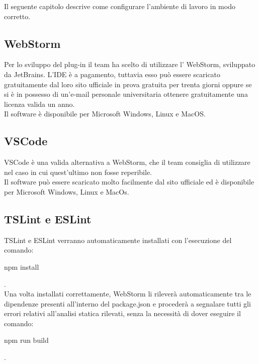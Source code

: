 Il seguente capitolo descrive come configurare l'ambiente di lavoro in modo corretto.

\subsection{WebStorm}
Per lo sviluppo del plug-in il team ha scelto di utilizzare l' WebStorm, sviluppato da JetBrains. L'IDE è a pagamento, tuttavia esso può essere scaricato gratuitamente dal loro sito ufficiale in prova gratuita per trenta giorni oppure se si è in possesso di un'e-mail personale universitaria ottenere gratuitamente una licenza valida un anno.\\
Il software è disponibile per Microsoft Windows, Linux e MacOS.
\subsection{VSCode}
VSCode è una valida alternativa a WebStorm, che il team consiglia di utilizzare nel caso in cui quest'ultimo non fosse reperibile.\\
Il software può essere scaricato molto facilmente dal sito ufficiale ed è disponibile per Microsoft Windows, Linux e MacOs.
\subsection{TSLint e ESLint}
TSLint e ESLint verranno automaticamente installati con l'esecuzione del comando:\\[0.2cm]
\hspace*{10mm}
\begin{ttfamily}
	npm install
\end{ttfamily}.\\[0.2cm]
Una volta installati correttamente, WebStorm li rileverà automaticamente tra le dipendenze presenti all'interno del package.json e procederà a segnalare tutti gli errori relativi all'analisi statica rilevati, senza la necessità di dover eseguire il comando:
\\[0.2cm]
\hspace*{10mm}
\begin{ttfamily}
npm run build
\end{ttfamily}.
\\[0.2cm]

\pagebreak